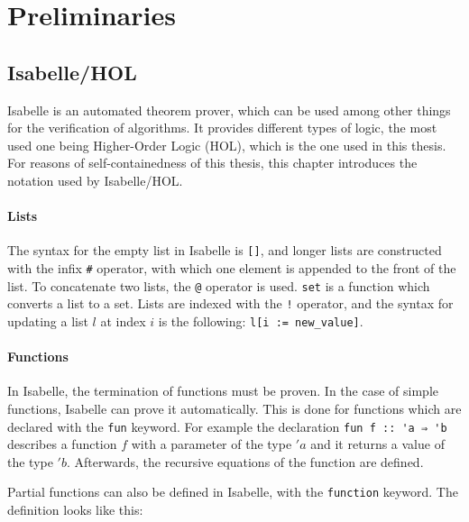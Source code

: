 
\chapter{Preliminaries}\label{chapter:preliminaries}

\section{Isabelle/HOL}

Isabelle\cite{isabelle} is an automated theorem prover, which can be used among other things for the verification of algorithms. It provides different types of logic, the most used one being Higher-Order Logic (HOL), which is the one used in this thesis. For reasons of self-containedness of this thesis, this chapter introduces the notation used by Isabelle/HOL.

\subsubsection{Lists}

The syntax for the empty list in Isabelle is \lstinline|[]|, and longer lists are constructed with the infix \lstinline|#| operator, with which one element is appended to the front of the list. To concatenate two lists, the \lstinline|@| operator is used. \lstinline|set| is a function which converts a list to a set. Lists are indexed with the \lstinline|!| operator, and the syntax for updating a list $l$ at index $i$ is the following: \lstinline|l[i := new_value]|.

\subsubsection{Functions}

In Isabelle, the termination of functions must be proven. In the case of simple functions, Isabelle can prove it automatically. This is done for functions which are declared with the \lstinline{fun} keyword. For example the declaration \lstinline|fun f :: 'a ⇒ 'b| describes a function $f$ with a parameter of the type $'a$ and it returns a value of the type $'b$. Afterwards, the recursive equations of the function are defined.

Partial functions can also be defined in Isabelle, with the \lstinline{function} keyword.
The definition looks like this:

